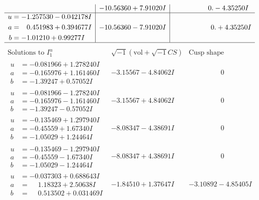 \documentclass[1p]{elsarticle_modified}
\theoremstyle{definition}
\newcommand{\I}{\sqrt{-1}}
\begin{document}
$$\begin{array}{c|c|c}
 & -10.56360 + 7.91020 I & \phantom{-0.000000 } 0. - 4.35250 I \\ \hline\begin{aligned}
u &= -1.257530 - 0.042178 I \\
a &= \phantom{-}0.451983 + 0.394677 I \\
b &= -1.01210 + 0.99277 I\end{aligned}
 & -10.56360 - 7.91020 I & \phantom{-0.000000 -}0. + 4.35250 I\\
 \hline 
 \end{array}$$\newpage$$\begin{array}{c|c|c}  
\text{Solutions to }I^u_{1}& \I (\text{vol} + \sqrt{-1}CS) & \text{Cusp shape}\\
 \hline 
\begin{aligned}
u &= -0.081966 + 1.278240 I \\
a &= -0.165976 + 1.161460 I \\
b &= -1.39247 + 0.57052 I\end{aligned}
 & -3.15567 - 4.84062 I & \phantom{-0.000000 } 0 \\ \hline\begin{aligned}
u &= -0.081966 - 1.278240 I \\
a &= -0.165976 - 1.161460 I \\
b &= -1.39247 - 0.57052 I\end{aligned}
 & -3.15567 + 4.84062 I & \phantom{-0.000000 } 0 \\ \hline\begin{aligned}
u &= -0.135469 + 1.297940 I \\
a &= -0.45559 + 1.67340 I \\
b &= -1.05029 + 1.24464 I\end{aligned}
 & -8.08347 - 4.38691 I & \phantom{-0.000000 } 0 \\ \hline\begin{aligned}
u &= -0.135469 - 1.297940 I \\
a &= -0.45559 - 1.67340 I \\
b &= -1.05029 - 1.24464 I\end{aligned}
 & -8.08347 + 4.38691 I & \phantom{-0.000000 } 0 \\ \hline\begin{aligned}
u &= -0.037303 + 0.688643 I \\
a &= \phantom{-}1.18323 + 2.50638 I \\
b &= \phantom{-}0.513502 + 0.031469 I\end{aligned}
 & -1.84510 + 1.37647 I & -3.10892 - 4.85405 I \\ \hline\begin{aligned}

\end{aligned}
\end{array}$$
\end{document}
